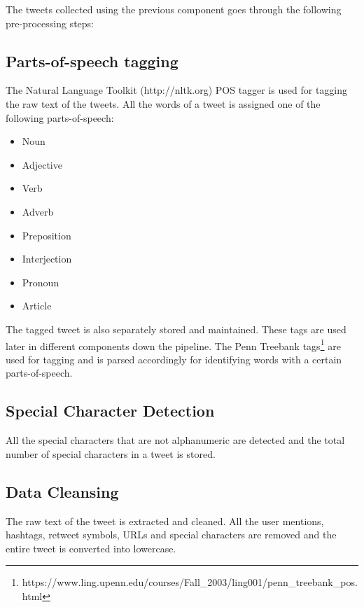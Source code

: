 
The tweets collected using the previous component goes through the following pre-processing steps:


\subsection{Parts-of-speech tagging} 
The Natural Language Toolkit (http://nltk.org) POS tagger is used for tagging the raw text of the tweets. All the words of a tweet is assigned one of the following parts-of-speech:
\begin{itemize}
\item Noun
\item Adjective
\item Verb
\item Adverb
\item Preposition
\item Interjection
\item Pronoun
\item Article
\end{itemize}

The tagged tweet is also separately stored and maintained. These tags are used later in different components down the pipeline. The Penn Treebank tags\footnote{https://www.ling.upenn.edu/courses/Fall\_2003/ling001/penn\_treebank\_pos.html} are used for tagging and is parsed accordingly for identifying words with a certain parts-of-speech.

\subsection{Special Character Detection}
All the special characters that are not alphanumeric are detected and the total number of special characters in a tweet is stored.


\subsection{Data Cleansing}
The raw text of the tweet is extracted and cleaned. All the user mentions, hashtags, retweet symbols, URLs and special characters are removed and the entire tweet is converted into lowercase. 

